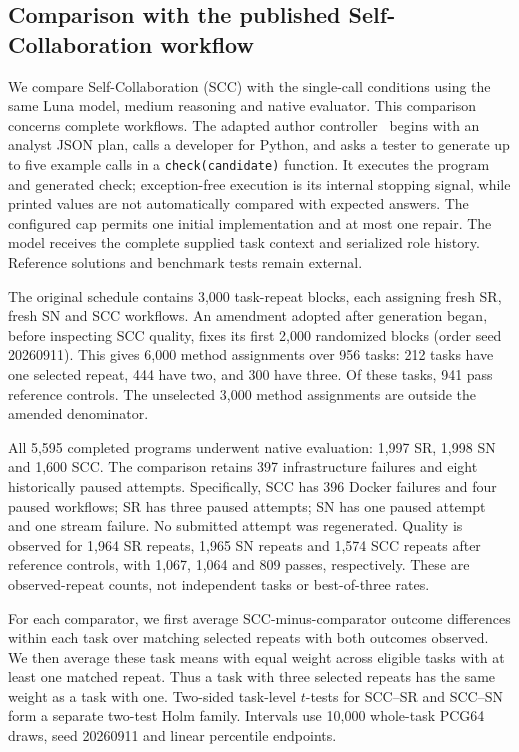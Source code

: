 \documentclass[10pt,letterpaper]{article}
\begin{document}
\subsection*{Comparison with the published Self-Collaboration workflow}
We compare Self-Collaboration (SCC) with the single-call conditions using the same Luna model, medium reasoning and native evaluator. This comparison concerns complete workflows. The adapted author controller~\cite{scc2024source} begins with an analyst JSON plan, calls a developer for Python, and asks a tester to generate up to five example calls in a \texttt{check(candidate)} function. It executes the program and generated check; exception-free execution is its internal stopping signal, while printed values are not automatically compared with expected answers. The configured cap permits one initial implementation and at most one repair. The model receives the complete supplied task context and serialized role history. Reference solutions and benchmark tests remain external.

The original schedule contains 3,000 task-repeat blocks, each assigning fresh SR, fresh SN and SCC workflows. An amendment adopted after generation began, before inspecting SCC quality, fixes its first 2,000 randomized blocks (order seed 20260911). This gives 6,000 method assignments over 956 tasks: 212 tasks have one selected repeat, 444 have two, and 300 have three. Of these tasks, 941 pass reference controls. The unselected 3,000 method assignments are outside the amended denominator.

All 5,595 completed programs underwent native evaluation: 1,997 SR, 1,998 SN and 1,600 SCC. The comparison retains 397 infrastructure failures and eight historically paused attempts. Specifically, SCC has 396 Docker failures and four paused workflows; SR has three paused attempts; SN has one paused attempt and one stream failure. No submitted attempt was regenerated. Quality is observed for 1,964 SR repeats, 1,965 SN repeats and 1,574 SCC repeats after reference controls, with 1,067, 1,064 and 809 passes, respectively. These are observed-repeat counts, not independent tasks or best-of-three rates.

For each comparator, we first average SCC-minus-comparator outcome differences within each task over matching selected repeats with both outcomes observed. We then average these task means with equal weight across eligible tasks with at least one matched repeat. Thus a task with three selected repeats has the same weight as a task with one. Two-sided task-level $t$-tests for SCC--SR and SCC--SN form a separate two-test Holm family. Intervals use 10,000 whole-task PCG64 draws, seed 20260911 and linear percentile endpoints.
\end{document}
